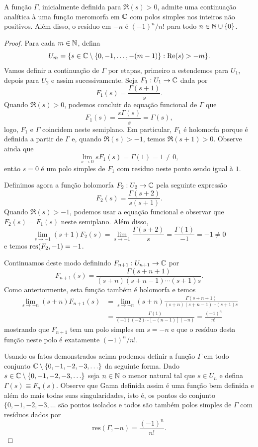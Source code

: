     \begin{teorema}
    \label{teo-cont-meromorfa-gamma}
        A função $\Gamma$, inicialmente definida para $\Re(s) > 0$, admite uma continuação analítica à uma função meromorfa em $\mathbb{C}$ com polos simples nos inteiros não positivos. Além disso, o resíduo em $-n$ é $(-1)^{n}/n!$ para todo $n \in \mathbb{N} \cup \{0\}$.
    \end{teorema}
    \begin{proof}
    Para cada $m \in \mathbb{N}$, defina 
    \[
    U_m = \{s \in \mathbb{C} \setminus \{0,-1, \dots, -(m-1)\}: \mathrm{Re}(s) > -m \}.
    \]
    Vamos definir a continuação de $\Gamma$ por etapas, primeiro a estendemos para $U_1$, depois para $U_2$ e assim sucessivamente. Seja $F_1 : U_1 \to \mathbb{C}$ dada por
    $$F_1(s) = \frac{\Gamma(s+1)}{s}.$$
    Quando $\Re(s) > 0$, podemos concluir da equação funcional de $\Gamma$ que 
    $$F_1(s) = \frac{s\Gamma(s)}{s} = \Gamma(s),$$
    logo, $F_1$ e $\Gamma$ coincidem neste semiplano. Em particular, $F_1$ é holomorfa porque é definida a partir de $\Gamma$ e, quando $\Re(s)> -1$, temos $\Re(s+1) > 0$. Observe ainda que
    $$ \lim_{s \to 0} sF_1(s) = \Gamma(1) = 1 \neq 0,$$
    então $s=0$ é um polo simples de $F_1$ com resíduo neste ponto sendo igual à $1$.
    
    Definimos agora a função holomorfa $F_2 : U_2 \to \mathbb{C}$ 
    pela seguinte expressão
    $$F_2(s) = \frac{\Gamma(s+2)}{s(s+1)}.$$
    Quando $\Re(s) > -1$, podemos usar a equação funcional e observar que $F_2(s) = F_1(s)$ neste semiplano. Além disso, 
    $$ \lim_{s \to -1} (s+1)F_2(s) = \lim_{s \to -1} \frac{\Gamma(s+2)}{s} = \frac{\Gamma(1)}{-1} = -1 \neq 0$$
    e temos $\operatorname{res}(F_2,-1) = -1$. 
    
    Continuamos deste modo definindo $F_{n+1} : U_{n+1} \to \mathbb{C}$ por
    $$F_{n+1}(s) = \frac{\Gamma(s+n+1)}{(s+n)(s+n-1) \cdots (s+1)s}.$$
    Como anteriormente, esta função também é holomorfa e temos
    \begin{align*}
        \lim_{s \to -n} (s+n)F_{n+1}(s) &= \lim_{s \to -n} (s+n)\frac{\Gamma(s+n+1)}{(s+n)(s+n-1) \cdots (s+1)s} \\
        &= \frac{\Gamma(1)}{(-1)(-2) \cdots [-(n-1)](-n)} = \frac{(-1)^n}{n!}
    \end{align*}
    mostrando que $F_{n+1}$ tem um polo simples em $s=-n$ e que o resíduo desta função neste polo é exatamente $(-1)^n/n!$. 
    
    Usando os fatos demonstrados acima podemos definir a função $\Gamma$ em todo conjunto $\mathbb{C}\setminus \{0,-1,-2,-3,\ldots\}$
    da seguinte forma. 
    Dado $s\in \mathbb{C}\setminus \{0,-1,-2,-3,\ldots\}$ seja $n\in \mathbb{N}$
    o menor natural tal que $s\in U_n$ e defina $\Gamma(s) \equiv F_n(s)$. Observe que Gama definida assim é uma função bem definida e além do mais todas suas singularidades, 
    isto é, os pontos do conjunto $\{0,-1,-2,-3,\ldots$ são pontos isolados e todos são também polos simples de $\Gamma$ com resíduos dados por 
    \[
    \mathrm{res}(\Gamma,-n) = \frac{(-1)^n}{n!}.
    \]
    \end{proof}
    
